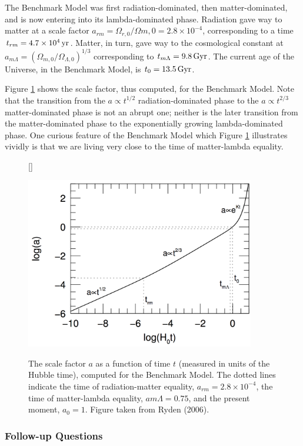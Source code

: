 \documentclass[a4paper,11pt]{article}
\begin{document}
{\noindent}The Benchmark Model was first radiation-dominated, then matter-dominated, and is now entering into its lambda-dominated phase. Radiation gave way to matter at a scale factor $a_{rm}=\Omega_{r,0}/\Omega{m,0}=2.8\times10^{-4}$, corresponding to a time $t_{rm}=4.7\times10^4\,{\rm yr}$. Matter, in turn, gave way to the cosmological constant at $a_{m\Lambda}=(\Omega_{m,0}/\Omega_{\Lambda,0})^{1/3}$ corresponding to $t_{m\Lambda}=9.8\,{\rm Gyr}$. The current age of the Universe, in the Benchmark Model, is $t_0=13.5\,{\rm Gyr}$.

{\noindent}Figure \ref{fig:avst} shows the scale factor, thus computed, for the Benchmark Model. Note that the transition from the $a\propto t^{1/2}$ radiation-dominated phase to the $a\propto t^{2/3}$ matter-dominated phase is not an abrupt one; neither is the later transition from the matter-dominated phase to the exponentially growing lambda-dominated phase. One curious feature of the Benchmark Model which Figure \ref{fig:avst} illustrates vividly is that we are living very close to the time of matter-lambda equality.

\begin{figure}[t]
    [\FBwidth]
    {\caption{\footnotesize{The scale factor $a$ as a function of time $t$ (measured in units of the Hubble time), computed for the Benchmark Model. The dotted lines indicate the time of radiation-matter equality, $a_{rm}=2.8\times10^{-4}$, the time of matter-lambda equality, $a{m\Lambda}=0.75$, and the present moment, $a_0=1$. Figure taken from Ryden (2006).}}
    \label{fig:avst}}
    {\includegraphics[width=10cm]{figures/avst.png}}
\end{figure}

\subsubsection{Follow-up Questions}
\end{document}
